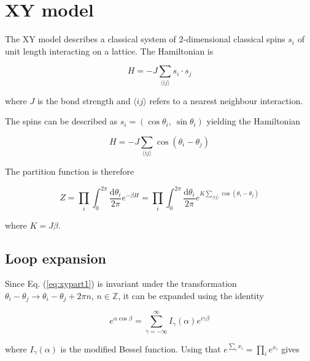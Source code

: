 \section{XY model}
\label{sec:XYModel}

The XY model describes a classical system of $2$-dimensional classical spins $s_i$ of unit length interacting on a lattice. The Hamiltonian is

\begin{equation}
    H = -J\sum_{\langle ij \rangle} s_i \cdot s_j
\end{equation}

\noindent where $J$ is the bond strength and $\langle ij \rangle$ refers to a nearest neighbour interaction.

The spins can be described as $s_i = (\cos \theta_i, \  \sin \theta_i)$ yielding the Hamiltonian

\begin{equation}
    H = - J \sum_{\langle ij \rangle} \cos(\theta_i - \theta_j)
\label{eq:xymodel}
\end{equation}

The partition function is therefore

\begin{equation}
    Z = \prod_i \int_{0}^{2\pi} \frac{\mathrm d \theta_i}{2 \pi} e^{-\beta H} = \prod_i \int_{0}^{2\pi} \frac{\mathrm d \theta_i}{2 \pi} e^{K \sum_{\langle ij \rangle} \cos(\theta_i - \theta_j)}
\label{eq:xypart1}
\end{equation}

\noindent where $K = J \beta$.

\newpage

\subsection{Loop expansion}
\label{subsec:XYLoopexp}

Since Eq. (\ref{eq:xypart1}) is invariant under the transformation $\theta_i - \theta_j \rightarrow \theta_i - \theta_j + 2 \pi n$, $n \in \mathbb{Z}$, it can be expanded using the identity

\begin{equation}
    e^{\alpha \cos \beta} = \sum_{\gamma = -\infty}^{\infty} I_\gamma ( \alpha ) e^{i \gamma \beta}
\end{equation}

\noindent where $I_\gamma(\alpha)$ is the modified Bessel function. Using that $e^{\sum_i x_i} = \prod_i e^{x_i}$ gives


